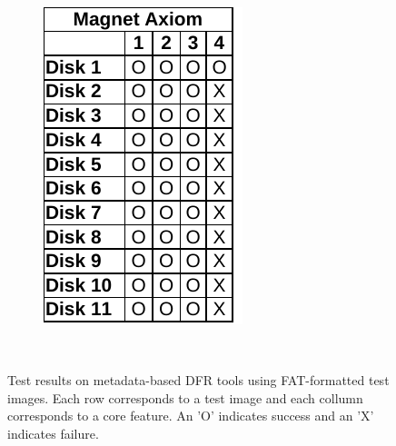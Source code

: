 \begin{paraphrase}
\begin{figure}
\begin{subfigure}{0.17\linewidth}
        \includegraphics[width=\linewidth]{fig/axiom_results_fat.pdf}
    \end{subfigure}~~
        
    \caption{Test results on metadata-based DFR tools using FAT-formatted test images. Each row corresponds to a test image and each collumn corresponds to a core feature. An 'O' indicates success and an 'X' indicates failure.}
    \label{fig:results_fat}
\end{figure}

\begin{figure}
    \centering


\end{figure}
\end{paraphrase}
